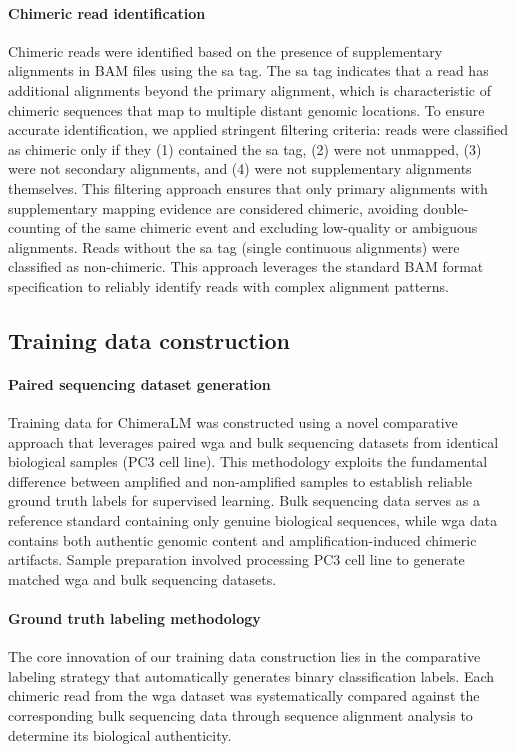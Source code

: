 \documentclass[pdflatex,sn-nature]{sn-jnl}%
\theoremstyle{thmstyleone}%
\theoremstyle{thmstyletwo}%
\theoremstyle{thmstylethree}%
\begin{document}
\paragraph{Chimeric read identification}
Chimeric reads were identified based on the presence of supplementary alignments in BAM files using the \gls{sa} tag.
The \gls{sa} tag indicates that a read has additional alignments beyond the primary alignment, which is characteristic of chimeric sequences that map to multiple distant genomic locations.
To ensure accurate identification, we applied stringent filtering criteria: reads were classified as chimeric only if they (1) contained the \gls{sa} tag, (2) were not unmapped, (3) were not secondary alignments, and (4) were not supplementary alignments themselves.
This filtering approach ensures that only primary alignments with supplementary mapping evidence are considered chimeric, avoiding double-counting of the same chimeric event and excluding low-quality or ambiguous alignments.
Reads without the \gls{sa} tag (single continuous alignments) were classified as non-chimeric.
This approach leverages the standard BAM format specification to reliably identify reads with complex alignment patterns.

\subsection*{Training data construction}

\paragraph{Paired sequencing dataset generation}
Training data for ChimeraLM was constructed using a novel comparative approach that leverages paired \gls{wga} and bulk sequencing datasets from identical biological samples (PC3 cell line).
This methodology exploits the fundamental difference between amplified and non-amplified samples to establish reliable ground truth labels for supervised learning.
Bulk sequencing data serves as a reference standard containing only genuine biological sequences, while \gls{wga} data contains both authentic genomic content and amplification-induced chimeric artifacts.
Sample preparation involved processing PC3 cell line to generate matched \gls{wga} and bulk sequencing datasets.

\paragraph{Ground truth labeling methodology}
The core innovation of our training data construction lies in the comparative labeling strategy that automatically generates binary classification labels.
Each chimeric read from the \gls{wga} dataset was systematically compared against the corresponding bulk sequencing data through sequence alignment analysis to determine its biological authenticity.
\end{document}
